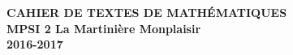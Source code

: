 \documentclass[12pt,a4paper]{article}
\begin{document}
\begin{center}
\Large\bf CAHIER DE TEXTES DE MATHÉMATIQUES\\
MPSI 2 La Martinière Monplaisir\\ 2016-2017
\end{center}
\vspace{1cm}
\vspace{.4cm}\\

% 
% 
% 
% 
% 
\end{document}
